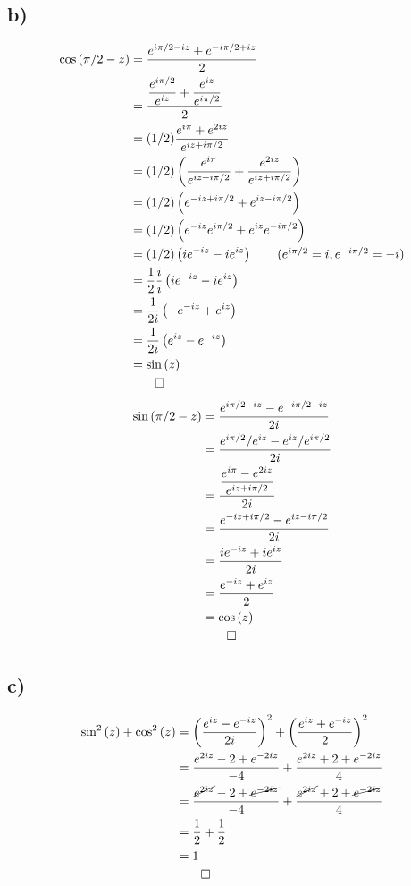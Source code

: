 \documentclass[12pt]{article}
\begin{document}
\subsection{b)}
\begin{align*}
	\cos{(\pi/2 - z)} &= \frac{e^{i\pi/2 - iz} + e^{-i\pi/2 + iz}}{2}\\
	&= \frac{\dfrac{e^{i\pi/2}}{e^{iz}} + \dfrac{e^{iz}}{e^{i\pi/2}}}{2}\\
	&= (1/2) \dfrac{e^{i\pi} + e^{2iz}}{e^{iz+i\pi/2}}\\
	&= (1/2) \left(\dfrac{e^{i\pi}}{e^{iz+i\pi/2}} +\dfrac{e^{2iz}}{e^{iz+i\pi/2}} \right)\\
	&= (1/2) \left(e^{-iz+i\pi/2} + e^{iz-i\pi/2}\right)\\
	&= (1/2) \left(e^{-iz}e^{i\pi/2} + e^{iz}e^{-i\pi/2}\right)\\
	&= (1/2) \left(ie^{-iz} - ie^{iz}\right) \tag{$e^{i\pi/2} = i, e^{-i\pi/2} = -i$}\\
	&= \dfrac{1}{2} \dfrac{i}{i} \left(ie^{-iz} - ie^{iz}\right)\\
	&= \dfrac{1}{2i} \left(-e^{-iz} + e^{iz}\right)\\
	&= \dfrac{1}{2i} \left(e^{iz} - e^{-iz}\right)\\
	&= \sin{(z)}\\
	&\qed
\end{align*}
\begin{align*}
	\sin{(\pi/2-z)} &= \dfrac{e^{i\pi/2-iz} - e^{-i\pi/2 + iz}}{2i}\\
	&= \dfrac{e^{i\pi/2}/e^{iz}-e^{iz}/e^{i\pi/2}}{2i}\\
	&= \dfrac{\dfrac{e^{i\pi} - e^{2iz}}{e^{iz+i\pi/2}}}{2i}\\
	&= \dfrac{e^{-iz+i\pi/2} - e^{iz-i\pi/2}}{2i}\\
	&= \dfrac{ie^{-iz} + ie^{iz}}{2i}\\
	&= \dfrac{e^{-iz} + e^{iz}}{2}\\
	&= \cos{(z)}\\
	&\qed
\end{align*}
\subsection{c)}
\begin{align*}
	\sin^2{(z)} + \cos^2{(z)} &= \left( \dfrac{e^{iz} - e^{-iz}}{2i}\right) ^2 + \left(\dfrac{e^{iz} + e^{-iz}}{2}\right)^2\\
	&= \dfrac{e^{2iz} - 2 + e^{-2iz}}{-4} + \dfrac{e^{2iz} + 2 + e^{-2iz}}{4}\\
	&= \dfrac{\cancel{e^{2iz}} - 2 + \cancel{e^{-2iz}}}{-4} + \dfrac{\cancel{e^{2iz}} + 2 + \cancel{e^{-2iz}}}{4}\\
	&= \dfrac{1}{2} + \dfrac{1}{2}\\
	&= 1\\
	&\qed
\end{align*}
\end{document}
